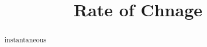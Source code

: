 \documentclass{ximera}
\title{Rate of Chnage}
\begin{document}
\begin{abstract}
instantaneous
\end{abstract}
\maketitle
\end{document}
